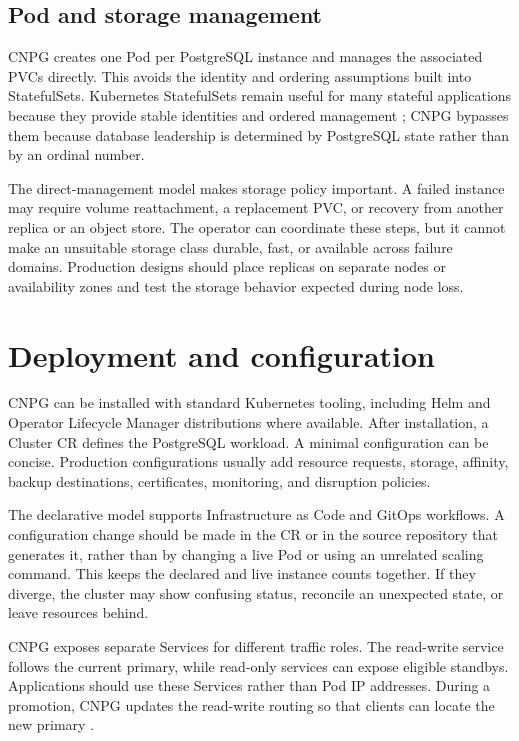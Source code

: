 \documentclass[11pt,a4paper]{article}
\begin{document}
\subsection{Pod and storage management}

CNPG creates one Pod per PostgreSQL instance and manages the associated PVCs directly. This avoids the identity and ordering assumptions built into StatefulSets. Kubernetes StatefulSets remain useful for many stateful applications because they provide stable identities and ordered management \cite{k8s-statefulsets}; CNPG bypasses them because database leadership is determined by PostgreSQL state rather than by an ordinal number.

The direct-management model makes storage policy important. A failed instance may require volume reattachment, a replacement PVC, or recovery from another replica or an object store. The operator can coordinate these steps, but it cannot make an unsuitable storage class durable, fast, or available across failure domains. Production designs should place replicas on separate nodes or availability zones and test the storage behavior expected during node loss.

\section{Deployment and configuration}

CNPG can be installed with standard Kubernetes tooling, including Helm and Operator Lifecycle Manager distributions where available. After installation, a Cluster CR defines the PostgreSQL workload. A minimal configuration can be concise. Production configurations usually add resource requests, storage, affinity, backup destinations, certificates, monitoring, and disruption policies.

The declarative model supports Infrastructure as Code and GitOps workflows. A configuration change should be made in the CR or in the source repository that generates it, rather than by changing a live Pod or using an unrelated scaling command. This keeps the declared and live instance counts together. If they diverge, the cluster may show confusing status, reconcile an unexpected state, or leave resources behind.

CNPG exposes separate Services for different traffic roles. The read-write service follows the current primary, while read-only services can expose eligible standbys. Applications should use these Services rather than Pod IP addresses. During a promotion, CNPG updates the read-write routing so that clients can locate the new primary \cite{cnpg-architecture}.
\end{document}
